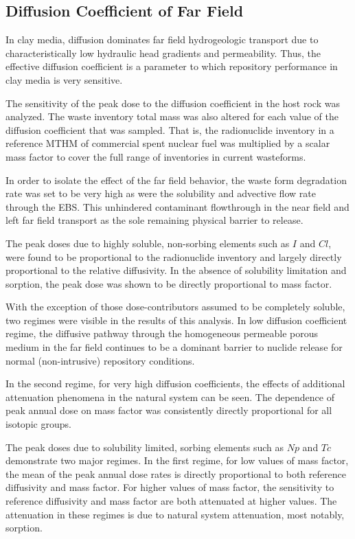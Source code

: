 
\subsection{Diffusion Coefficient of Far Field}
\label{sec:diffusivity}

In clay media, diffusion dominates far field hydrogeologic transport due to 
characteristically low hydraulic head gradients and permeability. Thus, the 
effective diffusion coefficient is a parameter to which repository performance 
in clay media is very sensitive. 

The sensitivity of the peak dose to the diffusion coefficient in the 
host rock was analyzed. 
The waste inventory total mass was also altered for each value of the diffusion  
coefficient that was sampled. That is, the radionuclide inventory in a reference 
\gls{MTHM} of commercial spent nuclear fuel was multiplied by a scalar mass factor 
to cover the full range of inventories in current wasteforms.

In order to isolate the effect of the far field behavior, the waste form 
degradation rate was set to be very high as were the solubility and advective 
flow rate through the  \gls{EBS}. This unhindered contaminant flowthrough 
in the near field and left far field transport as the sole remaining physical 
barrier to release.

The peak doses due to highly soluble, non-sorbing elements such as $I$ and $Cl$, 
were found to be proportional to the radionuclide inventory and 
largely directly proportional to the relative diffusivity. In the absence of 
solubility limitation and sorption, the peak dose was shown to be directly 
proportional to mass factor. 

With the exception of those dose-contributors assumed to be completely soluble, 
two regimes were visible in the results of this analysis. In low diffusion 
coefficient regime, the diffusive pathway through the homogeneous permeable 
porous medium in the far field continues to be a  dominant barrier to nuclide 
release for normal (non-intrusive) repository conditions. 

In the second regime, for very high diffusion coefficients, the effects of 
additional attenuation phenomena in the natural system can be seen.  The 
dependence of peak annual dose on mass factor was consistently directly 
proportional for all isotopic groups.

The peak doses due to solubility limited, sorbing elements such as $Np$ and 
$Tc$ demonstrate two major regimes. In the first regime, for 
low values of mass factor, the mean of the peak annual dose rates is directly 
proportional to both reference diffusivity and mass factor.  For higher values 
of mass factor, the sensitivity to reference diffusivity and mass factor are 
both attenuated at higher values.  The attenuation in these regimes 
is due to natural system attenuation, most notably, sorption.

